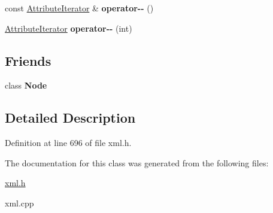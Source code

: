 \begin{DoxyCompactItemize}
\item 
\hypertarget{classphys_1_1xml_1_1AttributeIterator_aa26f070fa194c529285bb094e23215de}{
const \hyperlink{classphys_1_1xml_1_1AttributeIterator}{AttributeIterator} \& {\bfseries operator-\/-\/} ()}
\label{de/d78/classphys_1_1xml_1_1AttributeIterator_aa26f070fa194c529285bb094e23215de}

\item 
\hypertarget{classphys_1_1xml_1_1AttributeIterator_ae46ebed7b404ae085c47984f615a7597}{
\hyperlink{classphys_1_1xml_1_1AttributeIterator}{AttributeIterator} {\bfseries operator-\/-\/} (int)}
\label{de/d78/classphys_1_1xml_1_1AttributeIterator_ae46ebed7b404ae085c47984f615a7597}

\end{DoxyCompactItemize}
\subsection*{Friends}
\begin{DoxyCompactItemize}
\item 
\hypertarget{classphys_1_1xml_1_1AttributeIterator_a6db9d28bd448a131448276ee03de1e6d}{
class {\bfseries Node}}
\label{de/d78/classphys_1_1xml_1_1AttributeIterator_a6db9d28bd448a131448276ee03de1e6d}

\end{DoxyCompactItemize}


\subsection{Detailed Description}


Definition at line 696 of file xml.h.



The documentation for this class was generated from the following files:\begin{DoxyCompactItemize}
\item 
\hyperlink{xml_8h}{xml.h}\item 
xml.cpp\end{DoxyCompactItemize}
